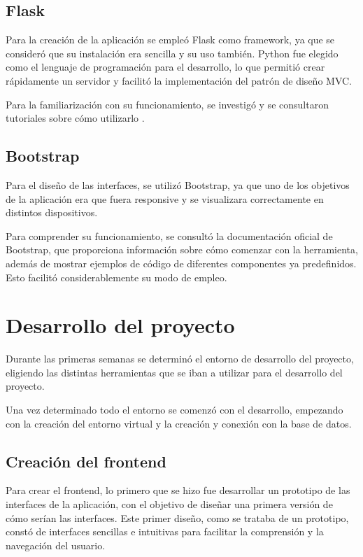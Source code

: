 \subsection{Flask}
Para la creación de la aplicación se empleó Flask como framework, ya que se consideró que su instalación era sencilla y su uso también. Python fue elegido como el lenguaje de programación para el desarrollo, lo que permitió crear rápidamente un servidor y facilitó la implementación del patrón de diseño MVC.

Para la familiarización con su funcionamiento, se investigó y se consultaron tutoriales sobre cómo utilizarlo \cite{formacion_flask}.

\subsection{Bootstrap}
Para el diseño de las interfaces, se utilizó Bootstrap, ya que uno de los objetivos de la aplicación era que fuera responsive y se visualizara correctamente en distintos dispositivos. 

Para comprender su funcionamiento, se consultó la documentación oficial de Bootstrap\cite{doc-bootstrap}, que proporciona información sobre cómo comenzar con la herramienta, además de mostrar ejemplos de código de diferentes componentes ya predefinidos. Esto facilitó considerablemente su modo de empleo.
\section{Desarrollo del proyecto}
Durante las primeras semanas se determinó el entorno de desarrollo del proyecto, eligiendo las distintas herramientas que se iban a utilizar para el desarrollo del proyecto.

Una vez determinado todo el entorno se comenzó con el desarrollo, empezando con la creación del entorno virtual y la creación y conexión con la base de datos.

\subsection{Creación del frontend}
Para crear el frontend, lo primero que se hizo fue desarrollar un prototipo de las interfaces de la aplicación, con el objetivo de diseñar una primera versión de cómo serían las interfaces. Este primer diseño, como se trataba de un prototipo, constó de interfaces sencillas e intuitivas para facilitar la comprensión y la navegación del usuario.

